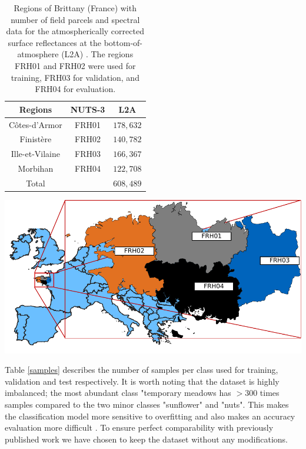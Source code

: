 \documentclass[journal,article,submit,pdftex,moreauthors]{Definitions/mdpi}
\begin{document}
\begin{table}[H]
	\caption{Regions of Brittany (France) with number of field parcels and spectral data for the atmospherically corrected surface reflectances at the bottom-of-atmosphere (L2A) \cite{Russwurm2020}. The regions FRH01 and FRH02 were used for training, FRH03 for validation, and FRH04 for evaluation.}
	\begin{minipage}[b]{.4\linewidth}
		\small
		\begin{tabular}{c  c  c} 
			\hline
			Regions     & NUTS-3 & L2A \\ [1ex] 
			\hline
			Côtes-d'Armor   & FRH01  & $178,632$ \\ [1ex]
			Finistère       & FRH02  & $140,782$ \\ [1ex]
			Ille-et-Vilaine & FRH03  & $166,367$ \\ [1ex]
			Morbihan		& FRH04  & $122,708$ \\ [1ex] 
			\hline
			Total			&		 & $608,489$ \\ [1ex] 
			\hline
		\end{tabular}
		\label{Regions}
	\end{minipage}
	\begin{minipage}[b]{.5\linewidth}
		\centering
		\includegraphics[width=0.9\linewidth]{figures/breizhCrops_regions_black.pdf}
	  \end{minipage}
\end{table}

Table \ref{samples} describes the number of samples per class used for training, validation and test respectively.
It is worth noting that the dataset is highly imbalanced; the most abundant class "temporary meadows has $> 300$ times samples compared to the two minor classes "sunflower" and "nuts". This makes the classification model more sensitive to overfitting and also makes an accuracy evaluation more difficult \cite{Foody2002}. To ensure perfect comparability with previously published work \cite{Russwurm2020} we have chosen to keep the dataset without any modifications.
\end{document}
